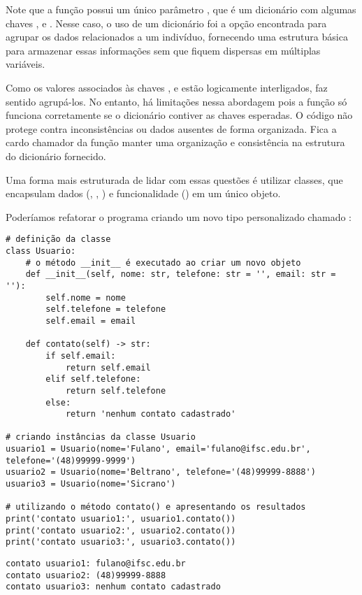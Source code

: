 Note que a função  possui um único parâmetro , que é um dicionário com
algumas chaves ,  e .
Nesse caso, o uso de um dicionário foi a opção encontrada para agrupar os dados relacionados a um indivíduo,
fornecendo uma estrutura básica para armazenar essas informações sem que fiquem dispersas em múltiplas variáveis.

Como os valores associados às chaves ,  e  estão logicamente interligados,
faz sentido agrupá-los.
No entanto, há limitações nessa abordagem pois a função  só funciona corretamente se o
dicionário contiver as chaves esperadas.
O código não protege contra inconsistências ou dados ausentes de forma organizada.
Fica a cardo chamador da função manter uma organização e consistência na estrutura do dicionário fornecido.

Uma forma mais estruturada de lidar com essas questões é utilizar classes, que encapsulam dados
(, , ) e funcionalidade () em um único objeto.


Poderíamos refatorar o programa criando um novo tipo personalizado chamado :
\begin{verbatim}
# definição da classe
class Usuario:
    # o método __init__ é executado ao criar um novo objeto
    def __init__(self, nome: str, telefone: str = '', email: str = ''):
        self.nome = nome
        self.telefone = telefone
        self.email = email

    def contato(self) -> str:
        if self.email:
            return self.email
        elif self.telefone:
            return self.telefone
        else:
            return 'nenhum contato cadastrado'

# criando instâncias da classe Usuario
usuario1 = Usuario(nome='Fulano', email='fulano@ifsc.edu.br', telefone='(48)99999-9999')
usuario2 = Usuario(nome='Beltrano', telefone='(48)99999-8888')
usuario3 = Usuario(nome='Sicrano')

# utilizando o método contato() e apresentando os resultados
print('contato usuario1:', usuario1.contato())
print('contato usuario2:', usuario2.contato())
print('contato usuario3:', usuario3.contato())
\end{verbatim}
\begin{verbatim}
contato usuario1: fulano@ifsc.edu.br
contato usuario2: (48)99999-8888
contato usuario3: nenhum contato cadastrado
\end{verbatim}

